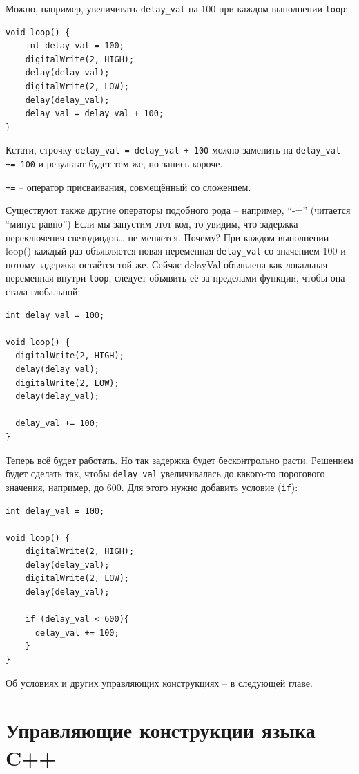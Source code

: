 \documentclass[a4paper,twoside]{book}
\begin{document}
Можно, например, увеличивать \texttt{delay\_val} на 100 при каждом выполнении
\texttt{loop}:

\begin{verbatim}
void loop() {
    int delay_val = 100;
    digitalWrite(2, HIGH);
    delay(delay_val);
    digitalWrite(2, LOW);
    delay(delay_val);
    delay_val = delay_val + 100;
}
\end{verbatim}

Кстати, строчку \texttt{delay\_val = delay\_val + 100} можно заменить на
\texttt{delay\_val += 100} и результат будет тем же, но запись короче.

\texttt{+=} -- оператор присваивания, совмещённый со сложением.

Существуют также другие операторы подобного рода -- например, ``-=''
(читается ``минус-равно'') Если мы запустим этот код, то увидим, что задержка
переключения светодиодов… не меняется. Почему? При каждом выполнении loop()
каждый раз объявляется новая переменная \texttt{delay\_val} со значением 100 и
потому задержка остаётся той же. Сейчас delayVal объявлена как локальная
переменная внутри \texttt{loop}, следует объявить её за пределами функции, чтобы
она стала глобальной:

\begin{verbatim}
int delay_val = 100;

void loop() {
  digitalWrite(2, HIGH);
  delay(delay_val);
  digitalWrite(2, LOW);
  delay(delay_val);

  delay_val += 100;
}
\end{verbatim}

Теперь всё будет работать. Но так задержка будет бесконтрольно расти. Решением
будет сделать так, чтобы \texttt{delay\_val} увеличивалась до какого-то
порогового значения, например, до 600. Для этого нужно добавить условие
(\texttt{if}):

\begin{verbatim}
int delay_val = 100;

void loop() {
    digitalWrite(2, HIGH);
    delay(delay_val);
    digitalWrite(2, LOW);
    delay(delay_val);

    if (delay_val < 600){
      delay_val += 100;
    }
}
\end{verbatim}

Об условиях и других управляющих конструкциях -- в следующей главе.

\chapter{Управляющие конструкции языка C++}
\end{document}
